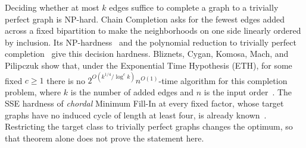 Deciding whether at most $k$ edges suffice to complete a graph to a
trivially perfect graph is NP-hard. Chain Completion asks for the
fewest edges added across a fixed bipartition to make the
neighborhoods on one side linearly ordered by inclusion. Its
NP-hardness~\cite{Yannakakis1981} and the polynomial reduction to
trivially perfect completion~\cite[Lemma~5.4]{BliznetsEtAl2016}
give this decision hardness.
Bliznets,
Cygan, Komosa, Mach, and Pilipczuk show that, under the Exponential
Time Hypothesis (ETH), for some
fixed $c\ge1$ there is no
$2^{O(k^{1/4}/\log^c k)}n^{O(1)}$-time algorithm for this completion
problem, where $k$ is the number of added edges and $n$ is the input
order~\cite[Theorem~1.1]{BliznetsEtAl2016}.
The SSE hardness of \emph{chordal} Minimum Fill-In at every fixed factor,
whose target graphs have no induced cycle of length at least four,
is already known~\cite[Theorem~1.2]{APW}. Restricting the
target class to trivially perfect graphs changes the optimum, so
that theorem alone does not prove the statement here.

